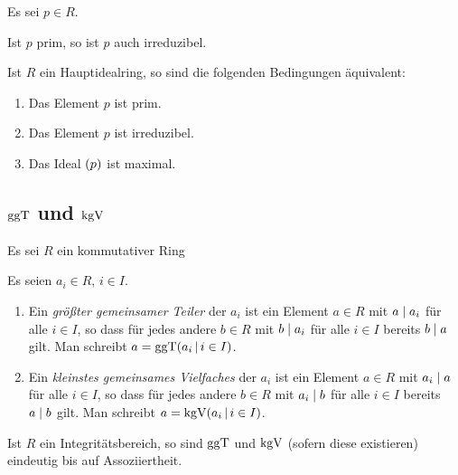 Es sei $p \in R$.

\begin{lemma}
  Ist $p$ prim, so ist $p$ auch irreduzibel.
\end{lemma}

\begin{lemma}
  Ist $R$ ein Hauptidealring, so sind die folgenden Bedingungen äquivalent:
  \begin{enumerate}
    \item
      Das Element $p$ ist prim.
    \item
      Das Element $p$ ist irreduzibel.
    \item
      Das Ideal $(p)$ ist maximal.
  \end{enumerate}
\end{lemma}



\subsection{\texorpdfstring{$\operatorname{ggT}$}{ggT} und \texorpdfstring{$\operatorname{kgV}$}{kgV}}

Es sei $R$ ein kommutativer Ring

\begin{definition}
  Es seien $a_i \in R$, $i \in I$.
  \begin{enumerate}
    \item
      Ein \emph{größter gemeinsamer Teiler} der $a_i$ ist ein Element $a \in R$ mit $a \mathrel{|} a_i$ für alle $i \in I$, so dass für jedes andere $b \in R$ mit $b \mathrel{|} a_i$ für alle $i \in I$ bereits $b \mathrel{|} a$ gilt.
      Man schreibt $a = \ggT( a_i \suchthat i \in I )$.
    \item
      Ein \emph{kleinstes gemeinsames Vielfaches} der $a_i$ ist ein Element $a \in R$ mit $a_i \mathrel{|} a$ für alle $i \in I$, so dass für jedes andere $b \in R$ mit $a_i \mathrel{|} b$ für alle $i \in I$ bereits $a \mathrel{|} b$ gilt.
      Man schreibt $a = \kgV( a_i \suchthat i \in I )$.
  \end{enumerate}
\end{definition}

\begin{lemma}
  Ist $R$ ein Integritätsbereich, so sind $\operatorname{ggT}$ und $\operatorname{kgV}$ \textup(sofern diese existieren\textup) eindeutig bis auf Assoziiertheit.
\end{lemma}

